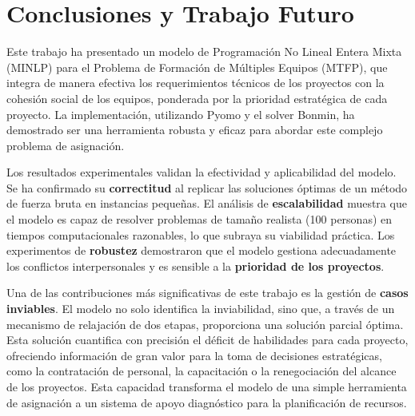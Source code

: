\documentclass[conference]{IEEEtran}
\begin{document}

\section{Conclusiones y Trabajo Futuro}
Este trabajo ha presentado un modelo de Programación No Lineal Entera Mixta (MINLP) para el Problema de Formación de Múltiples Equipos (MTFP), que integra de manera efectiva los requerimientos técnicos de los proyectos con la cohesión social de los equipos, ponderada por la prioridad estratégica de cada proyecto. La implementación, utilizando Pyomo y el solver Bonmin, ha demostrado ser una herramienta robusta y eficaz para abordar este complejo problema de asignación.

Los resultados experimentales validan la efectividad y aplicabilidad del modelo. Se ha confirmado su \textbf{correctitud} al replicar las soluciones óptimas de un método de fuerza bruta en instancias pequeñas. El análisis de \textbf{escalabilidad} muestra que el modelo es capaz de resolver problemas de tamaño realista (100 personas) en tiempos computacionales razonables, lo que subraya su viabilidad práctica. Los experimentos de \textbf{robustez} demostraron que el modelo gestiona adecuadamente los conflictos interpersonales y es sensible a la \textbf{prioridad de los proyectos}.

Una de las contribuciones más significativas de este trabajo es la gestión de \textbf{casos inviables}. El modelo no solo identifica la inviabilidad, sino que, a través de un mecanismo de relajación de dos etapas, proporciona una solución parcial óptima. Esta solución cuantifica con precisión el déficit de habilidades para cada proyecto, ofreciendo información de gran valor para la toma de decisiones estratégicas, como la contratación de personal, la capacitación o la renegociación del alcance de los proyectos. Esta capacidad transforma el modelo de una simple herramienta de asignación a un sistema de apoyo diagnóstico para la planificación de recursos.
\end{document}
